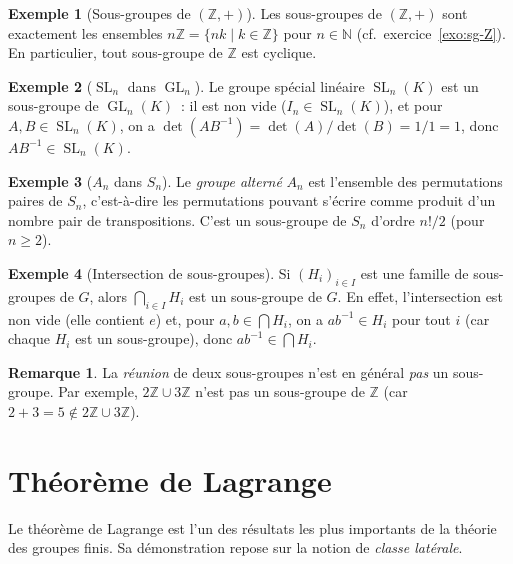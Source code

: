\documentclass[12pt,a4paper,openany]{book}
\theoremstyle{definition}
\newtheorem{remarque}{Remarque}[chapter]
\newtheorem{exemple}{Exemple}[chapter]
\newcommand{\N}{\mathbb{N}}
\newcommand{\Z}{\mathbb{Z}}
\DeclareMathOperator{\GL}{GL}
\DeclareMathOperator{\SL}{SL}
\begin{document}
\begin{exemple}[Sous-groupes de $(\Z, +)$]
\label{ex:sg-Z}
\index{Z@$\Z$!sous-groupes de}
Les sous-groupes de $(\Z, +)$ sont exactement les ensembles $n\Z = \{nk \mid k \in \Z\}$
pour $n \in \N$ (cf.\ exercice~\ref{exo:sg-Z}). En particulier, tout sous-groupe de
$\Z$ est cyclique.
\end{exemple}

\begin{exemple}[$\SL_n$ dans $\GL_n$]
\label{ex:SLn-dans-GLn}
Le groupe spécial linéaire $\SL_n(K)$ est un sous-groupe de $\GL_n(K)$~: il est non
vide ($I_n \in \SL_n(K)$), et pour $A, B \in \SL_n(K)$, on a $\det(AB^{-1}) =
\det(A)/\det(B) = 1/1 = 1$, donc $AB^{-1} \in \SL_n(K)$.
\end{exemple}

\begin{exemple}[$A_n$ dans $S_n$]
\label{ex:An-dans-Sn}
Le \emph{groupe alterné} $A_n$ est l'ensemble des permutations paires de $S_n$,
c'est-à-dire les permutations pouvant s'écrire comme produit d'un nombre pair de
transpositions. C'est un sous-groupe de $S_n$ d'ordre $n!/2$ (pour $n \geq 2$).
\end{exemple}

\begin{exemple}[Intersection de sous-groupes]
\label{ex:intersection-sg}
Si $(H_i)_{i \in I}$ est une famille de sous-groupes de $G$, alors $\bigcap_{i \in I}
H_i$ est un sous-groupe de $G$. En effet, l'intersection est non vide (elle contient
$e$) et, pour $a, b \in \bigcap H_i$, on a $ab^{-1} \in H_i$ pour tout $i$ (car chaque
$H_i$ est un sous-groupe), donc $ab^{-1} \in \bigcap H_i$.
\end{exemple}

\begin{remarque}
La \emph{réunion} de deux sous-groupes n'est en général \emph{pas} un sous-groupe. Par
exemple, $2\Z \cup 3\Z$ n'est pas un sous-groupe de $\Z$ (car $2 + 3 = 5 \notin 2\Z
\cup 3\Z$).
\end{remarque}

\section{Théorème de Lagrange}
\label{sec:ch2-lagrange}

Le théorème de Lagrange est l'un des résultats les plus
importants de la théorie des groupes finis. Sa démonstration repose sur la notion de
\emph{classe latérale}.
\end{document}
